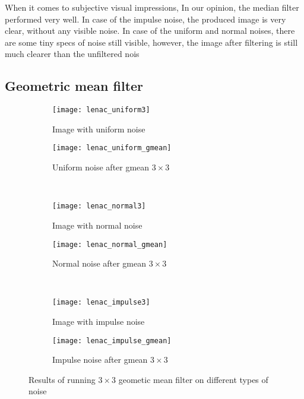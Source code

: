 \documentclass[12pt]{article}
\begin{document}
When it comes to subjective visual impressions,
In our opinion, the median filter performed very well.
In case of the impulse noise, the produced image is very clear, without any visible noise.
In case of the uniform and normal noises, there are some tiny specs of noise still visible,
however, the image after filtering is still much clearer than the unfiltered nois

\clearpage
\subsection{Geometric mean filter}

\begin{figure}[ht]\centering
    \begin{subfigure}[t]{.4\textwidth}\centering
        \texttt{[image: lenac\_uniform3]}
        \caption{Image with uniform noise}
    \end{subfigure}
    \begin{subfigure}[t]{.4\textwidth}\centering
        \texttt{[image: lenac\_uniform\_gmean]}
        \caption{Uniform noise after gmean $3\times3$}
    \end{subfigure}\\[2em]
    \begin{subfigure}[t]{.4\textwidth}\centering
        \texttt{[image: lenac\_normal3]}
        \caption{Image with normal noise}
    \end{subfigure}
    \begin{subfigure}[t]{.4\textwidth}\centering
        \texttt{[image: lenac\_normal\_gmean]}
        \caption{Normal noise after gmean $3\times3$}
    \end{subfigure}\\[2em]
    \begin{subfigure}[t]{.4\textwidth}\centering
        \texttt{[image: lenac\_impulse3]}
        \caption{Image with impulse noise}
    \end{subfigure}
    \begin{subfigure}[t]{.4\textwidth}\centering
        \texttt{[image: lenac\_impulse\_gmean]}
        \caption{Impulse noise after gmean $3\times3$}
    \end{subfigure}
    \caption{Results of running $3\times3$ geometic mean filter on different types of noise}
\end{figure}
\end{document}
